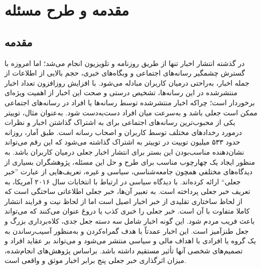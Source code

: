 \chapter{مقدمه و طرح مسئله}
\section{مقدمه}
در گذشته انتشار اخبار تنها از طریق روزنامه و تلویزیون انجام می‌شد؛ اما امروزه با گسترش چشمگیر رسانه‌های اجتماعی و  وبگاه‌های خبری، حجم بالایی از اطلاعات از جمله اخبار، به‌راحتی درمیان کاربران مبادله می‌شود. با افزایش روزافزون تعداد اخبار  منتشرشده در این رسانه‌ها، تشخیص درستی و صحت این اخبار از اهمیت ویژه‌ای برخوردار است؛ چراکه اخبار منتشرشده توسط  رسانه‌ها یا افراد در رسانه‌های اجتماعی ممکن است جعلی باشد و به‌سرعت میان افراد دست‌به‌دست شود. به‌عنوان مثال، توییتر  یکی از محبوب‌ترین رسانه‌های اجتماعی برای به اشتراک گذاشتن اخبار و نظرات درمورد رخدادهای مختلف توسط کاربران و اصحاب رسانه است. طبق آمار، روزانه حدود  ۵۳۳ میلیون توییت در توییتر به اشتراک گذاشته می‌شود که این رقم می‌تواند نشان‌دهنده مناسب‌بودن این بستر برای انتشار اخبار جعلی درمیان کاربران باشد. 
به منظور ایجاد یک چهارچوب مناسب برای طرح و حل این مسئله، پژوهشگران بسیاری از دیدگاه‌های مختلفی همچون جامعه‌شناسی، سیاسی و غیره، تعریف‌هایی از عبارت ''خبر جعلی`` ارائه کرده‌اند.
\cite{lazer2018science}
با دیدگاه سیاسی در ارتباط با انتخابات سال ۲۰۱۶ آمریکا، به تعریف خبر‌ جعلی پرداخته است. به تعبیر آن‌ها، خبر جعلی اطلاعاتی ساختگی است که از لحاظ ساختاری تقلیدی از خبر اخبار اصیل است اما از لحاظ نیت و فرایند انتشار کاملا متفاوت با آن است.
\cite{rubin2015deception}
خبر جعلی را خبری کذب یا دروغ عنوان می‌کنند که می‌تواند باعث فریب مردم شود. این گونه اخبار شامل سه دسته جعل جدی، کلاه‌برداری بزرگ و جعل طنزآمیز است. این اخبار عمدتاً با هدف گمراه‌کردن و به‌منظور آسیب‌‌رساندن به یک گروه یا افرادی با اهداف مالی و سیاسی  منتشر می‌شود و می‌تواند بر عقاید افراد و تصمیم‌های شخصی آنها تأثیر مستقیم داشته باشد. براساس پژوهش‌های انجام‌شده، میزان اثرگذاری خبر جعلی پنج برابر اخبار موثق و واقعی است.
